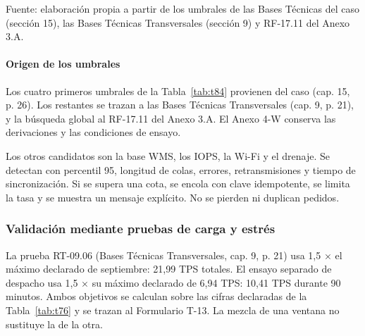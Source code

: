 {\fontsize{9pt}{11pt}\selectfont\raggedright Fuente: elaboración propia a partir de los umbrales de las Bases Técnicas del caso (sección 15), las Bases Técnicas Transversales (sección 9) y RF-17.11 del Anexo 3.A.\par}

\paragraph*{Origen de los umbrales}
Los cuatro primeros umbrales de la Tabla~\ref{tab:t84} provienen del caso (cap. 15, p. 26). Los restantes se trazan a las Bases Técnicas Transversales (cap. 9, p. 21), y la búsqueda global al RF-17.11 del Anexo 3.A. El Anexo 4-W conserva las derivaciones y las condiciones de ensayo.

Los otros candidatos son la base WMS, los IOPS, la Wi-Fi y el drenaje. Se detectan con percentil 95, longitud de colas, errores, retransmisiones y tiempo de sincronización. Si se supera una cota, se encola con clave idempotente, se limita la tasa y se muestra un mensaje explícito. No se pierden ni duplican pedidos.

\subsubsection{Validación mediante pruebas de carga y estrés}
\label{sec:dimensionamiento-pruebas}

La prueba RT-09.06 (Bases Técnicas Transversales, cap. 9, p. 21) usa 1,5 × el máximo declarado de septiembre: 21,99 TPS totales. El ensayo separado de despacho usa 1,5 × su máximo declarado de 6,94 TPS: 10,41 TPS durante 90 minutos. Ambos objetivos se calculan sobre las cifras declaradas de la Tabla~\ref{tab:t76} y se trazan al Formulario T-13. La mezcla de una ventana no sustituye la de la otra.

